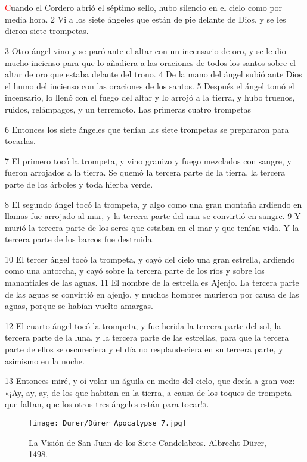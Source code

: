 \documentclass[12pt,twocolumn,twoside]{book}
\begin{document}
\chapter{}
\lettrine[lines=4]{\textcolor{red}{C}}{}uando el Cordero abrió el séptimo sello, hubo silencio en el cielo como por media hora. 2 Vi a los siete ángeles que están de pie delante de Dios, y se les dieron siete trompetas.

3 Otro ángel vino y se paró ante el altar con un incensario de oro, y se le dio mucho incienso para que lo añadiera a las oraciones de todos los santos sobre el altar de oro que estaba delante del trono. 4 De la mano del ángel subió ante Dios el humo del incienso con las oraciones de los santos. 5 Después el ángel tomó el incensario, lo llenó con el fuego del altar y lo arrojó a la tierra, y hubo truenos, ruidos, relámpagos, y un terremoto.
Las primeras cuatro trompetas

6 Entonces los siete ángeles que tenían las siete trompetas se prepararon para tocarlas.

7 El primero tocó la trompeta, y vino granizo y fuego mezclados con sangre, y fueron arrojados a la tierra. Se quemó la tercera parte de la tierra, la tercera parte de los árboles y toda hierba verde.

8 El segundo ángel tocó la trompeta, y algo como una gran montaña ardiendo en llamas fue arrojado al mar, y la tercera parte del mar se convirtió en sangre. 9 Y murió la tercera parte de los seres que estaban en el mar y que tenían vida. Y la tercera parte de los barcos fue destruida.

10 El tercer ángel tocó la trompeta, y cayó del cielo una gran estrella, ardiendo como una antorcha, y cayó sobre la tercera parte de los ríos y sobre los manantiales de las aguas. 11 El nombre de la estrella es Ajenjo. La tercera parte de las aguas se convirtió en ajenjo, y muchos hombres murieron por causa de las aguas, porque se habían vuelto amargas.

12 El cuarto ángel tocó la trompeta, y fue herida la tercera parte del sol, la tercera parte de la luna, y la tercera parte de las estrellas, para que la tercera parte de ellos se oscureciera y el día no resplandeciera en su tercera parte, y asimismo en la noche.

13 Entonces miré, y oí volar un águila en medio del cielo, que decía a gran voz: «¡Ay, ay, ay, de los que habitan en la tierra, a causa de los toques de trompeta que faltan, que los otros tres ángeles están para tocar!».
\begin{figure*}[p!]
	\centering
       \texttt{[image: Durer/Dürer\_Apocalypse\_7.jpg]}    
    	\caption{La Visión de San Juan de los Siete Candelabros. Albrecht Dürer, 1498.}
\end{figure*}
\end{document}
